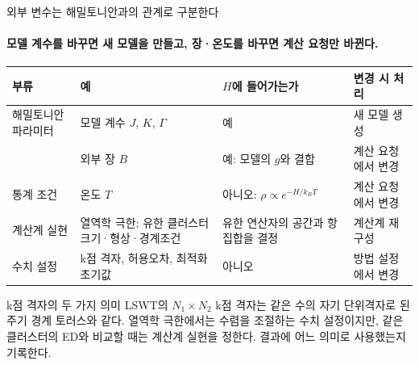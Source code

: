 \begin{frame}[label=external-variables]{외부 변수는 해밀토니안과의 관계로 구분한다}
  \framesubtitle{모델 계수를 바꾸면 새 모델을 만들고, 장·온도를 바꾸면 계산 요청만 바뀐다.}
  \small
  \begin{tabularx}{\textwidth}{@{}p{2.7cm}p{3.9cm}Yp{2.9cm}@{}}
    \toprule
    부류 & 예 & $H$에 들어가는가 & 변경 시 처리 \\
    \midrule
    해밀토니안 파라미터 & 모델 계수 $J$, $K$, $\Gamma$ & 예 & 새 모델 생성 \\
     & 외부 장 $B$ & 예: 모델의 $g$와 결합 & 계산 요청에서 변경 \\
    통계 조건 & 온도 $T$ & 아니오: $\rho\propto e^{-H/k_BT}$ & 계산 요청에서 변경 \\
    계산계 실현 & 열역학 극한; 유한 클러스터 크기·형상·경계조건 & 유한 연산자의 공간과 항 집합을 결정 & 계산계 재구성 \\
    수치 설정 & k점 격자, 허용오차, 최적화 초기값 & 아니오 & 방법 설정에서 변경 \\
    \bottomrule
  \end{tabularx}
  \par\medskip
  \begin{mdcallout}[note]{k점 격자의 두 가지 의미}
    LSWT의 $N_1\times N_2$ k점 격자는 같은 수의 자기 단위격자로 된 주기 경계 토러스와 같다.
    열역학 극한에서는 수렴을 조절하는 수치 설정이지만, 같은 클러스터의 ED와 비교할 때는
    계산계 실현을 정한다. 결과에 어느 의미로 사용했는지 기록한다.
  \end{mdcallout}
\end{frame}

